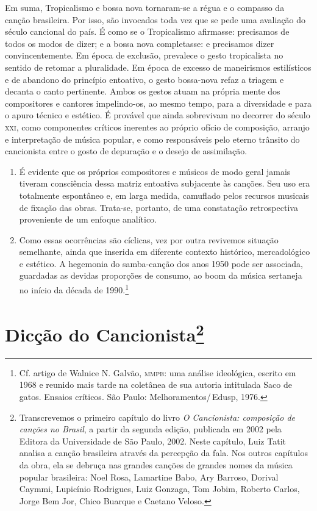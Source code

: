 Em suma, Tropicalismo e bossa nova tornaram-se a régua e o compasso da
canção brasileira. Por isso, são invocados toda vez que se pede uma
avaliação do século cancional do país. É como se o Tropicalismo
afirmasse: precisamos de todos os modos de dizer; e a bossa nova
completasse: e precisamos dizer convincentemente. Em época de exclusão,
prevalece o gesto tropicalista no sentido de retomar a pluralidade. Em
época de excesso de maneirismos estilísticos e de abandono do princípio
entoativo, o gesto bossa-nova refaz a triagem e decanta o canto
pertinente. Ambos os gestos atuam na própria mente dos compositores e
cantores impelindo-os, ao mesmo tempo, para a diversidade e para o apuro
técnico e estético. É provável que ainda sobrevivam no decorrer do
século \textsc{xxi}, como componentes críticos inerentes ao próprio ofício de
composição, arranjo e interpretação de música popular, e como
responsáveis pelo eterno trânsito do cancionista entre o gosto de
depuração e o desejo de assimilação.

\begin{enumerate}
\item É evidente que os próprios compositores e músicos de modo geral
jamais tiveram consciência dessa matriz entoativa subjacente às canções.
Seu uso era totalmente espontâneo e, em larga medida, camuflado pelos
recursos musicais de fixação das obras. Trata-se, portanto, de uma
constatação retrospectiva proveniente de um enfoque analítico.

\item Como essas ocorrências são cíclicas, vez por outra revivemos
situação semelhante, ainda que inserida em diferente contexto histórico,
mercadológico e estético. A hegemonia do samba-canção dos anos 1950 pode
ser associada, guardadas as devidas proporções de consumo, ao boom da
música sertaneja no início da década de 1990.\footnote{Cf. artigo de Walnice N. Galvão, \textsc{mmpb}: uma análise ideológica, escrito em 1968 e reunido mais tarde na coletânea de sua autoria intitulada Saco de gatos. Ensaios críticos. São Paulo: Melhoramentos/\,Edusp, 1976.} 
\end{enumerate}

\chapter{Dicção do Cancionista\footnote{Transcrevemos o primeiro capítulo do livro \textit{O Cancionista: composição de canções no Brasil}, a partir da segunda edição, publicada em 2002 pela Editora da Universidade de São Paulo,
2002. Neste capítulo, Luiz Tatit analisa a canção brasileira através da percepção da fala. Nos outros capítulos da obra, ela se debruça nas grandes canções de grandes nomes da música popular brasileira: Noel Rosa, Lamartine Babo, Ary Barroso, Dorival Caymmi, Lupicínio Rodrigues, Luiz Gonzaga, Tom Jobim, Roberto Carlos, Jorge Bem Jor, Chico Buarque e Caetano Veloso.}}

